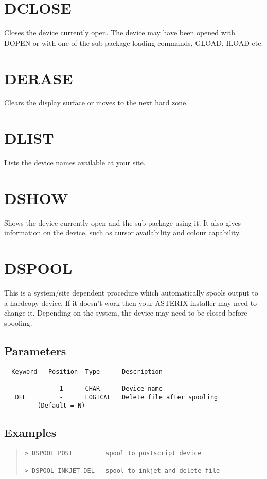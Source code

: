 \documentclass{book}
\renewcommand{\_}{{\tt\char'137}}     %
\begin{document}
\section{DCLOSE}
Closes the device currently open. The device may have been opened
with DOPEN or with one of the sub-package loading commands, GLOAD,
ILOAD etc.

\section{DERASE}
Clears the display surface or moves to the next hard zone.

\section{DLIST}
Lists the device names available at your site.

\section{DSHOW}
Shows the device currently open and the sub-package using it.
It also gives information on the device, such as cursor availability
and colour capability.

\section{DSPOOL}
This is a system/site dependent procedure which automatically
spools output to a hardcopy device. If it doesn't work then
your ASTERIX installer may need to change it. Depending on
the system, the device may need to be closed before spooling.

\subsection{Parameters}
\begin{verbatim}
  Keyword   Position  Type      Description
  -------   --------  ----      -----------
    -          1      CHAR      Device name
   DEL         -      LOGICAL   Delete file after spooling
         (Default = N)

\end{verbatim}\subsection{Examples}
\begin{quote}\begin{verbatim}
> DSPOOL POST         spool to postscript device

> DSPOOL INKJET DEL   spool to inkjet and delete file
\end{verbatim}\end{quote}
\end{document}
